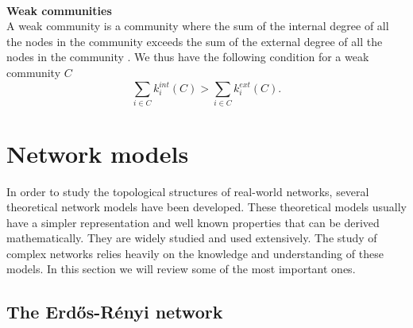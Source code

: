 \documentclass[11 pt , letterpaper , twoside , openright]{book}
\begin{document}
\\
\newline
\textbf{Weak communities}\\
\newline
A weak community is a community where the sum of the internal degree of all the nodes in the community exceeds the sum of the external degree of all the nodes in the community \cite{Albert2016}. We thus have the following condition for a weak community $C$ \cite{Albert2016}
\begin{equation}
	\sum_{i \in C} k_i^{int}(C) > \sum_{i \in C}k_i^{ext}(C).
\end{equation}

\section{Network models}
\label{netModel}

In order to study the topological structures of real-world networks, several theoretical network models have been developed. These theoretical models usually have a simpler representation and well known properties that can be derived mathematically. They are widely studied and used extensively. The study of complex networks relies heavily on the knowledge and understanding of these models. In this section we will review some of the most important ones.

\subsection{The Erd\H{o}s-R\'{e}nyi network}
\end{document}

